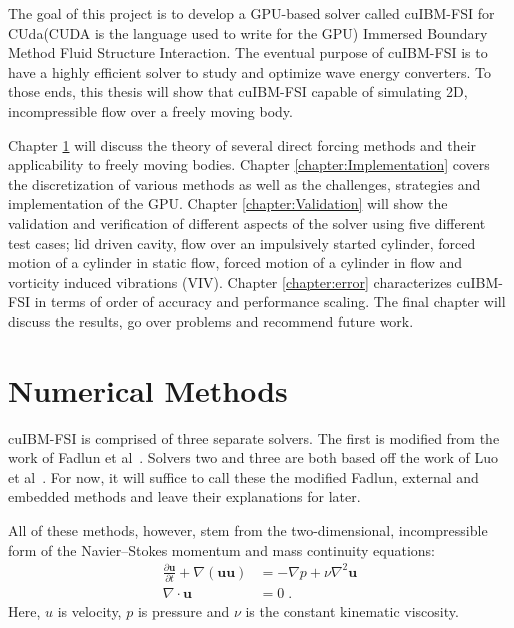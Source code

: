 The goal of this project is to develop a GPU-based solver called cuIBM-FSI for CUda(CUDA is the language used to write for the GPU) Immersed Boundary Method Fluid Structure Interaction. 
The eventual purpose of cuIBM-FSI is to have a highly efficient solver to study and optimize wave energy converters. 
To those ends, this thesis will show that cuIBM-FSI capable of simulating 2D, incompressible flow over a freely moving body. 

Chapter \ref{chapter:Numerical Methods} will discuss the theory of several direct forcing methods and their applicability to freely moving bodies. 
Chapter \ref{chapter:Implementation} covers the discretization of various methods as well as the challenges, strategies and implementation of the GPU.
Chapter \ref{chapter:Validation} will show the validation and verification of different aspects of the solver using five different test cases; lid driven cavity, flow over an impulsively started cylinder, forced motion of a cylinder in static flow, forced motion of a cylinder in flow and vorticity induced vibrations (VIV). 
Chapter \ref{chapter:error} characterizes cuIBM-FSI in terms of order of accuracy and performance scaling. 
The final chapter will discuss the results, go over problems and recommend future work.

\chapter{Numerical Methods}\label{chapter:Numerical Methods}
cuIBM-FSI is comprised of three separate solvers. 
The first is modified from the work of Fadlun et al~\cite{Fadlun:2000fl}. 
Solvers two and three are both based off the work of Luo et al~\cite{Luo:2012gx}. 
For now, it will suffice to call these the modified Fadlun, external and embedded methods and leave their explanations for later. 


All of these methods, however, stem from the two-dimensional, incompressible form of the Navier--Stokes momentum and mass continuity equations:
\begin{align}
\frac{\partial \textbf{u}}{\partial t} + \nabla ( \textbf{uu} ) &= -\nabla p + \nu\nabla^{2}\textbf{u} \label{eq:NavierStokes} \\
\nabla \cdot \textbf{u} &= 0 \label{eq:Continuity} \;.
\end{align}
Here, $u$ is velocity, $p$ is pressure and $\nu$ is the constant kinematic viscosity.

